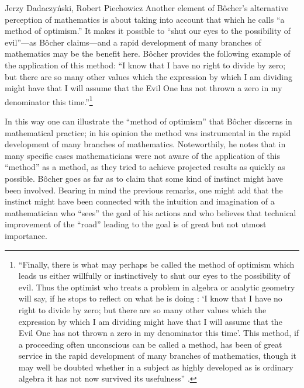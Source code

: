 \begin{artengenv}{Jerzy Dadaczyński, Robert Piechowicz}
Another element of Bôcher's alternative perception of mathematics is about taking into account that which he calls ``a method of optimism.'' It makes it possible to ``shut our eyes to the possibility of evil''---as Bôcher claims---and a rapid development of many branches of mathematics may be the benefit here. Bôcher provides the following example of the application of this method: ``I know that I have no right to divide by zero; but there are so many other values which the expression by which I am dividing might have that I will assume that the Evil One has not thrown a zero in my denominator this time.''\footnote{``Finally, there is what may perhaps be called the method of optimism which leads us either willfully or instinctively to shut our eyes to the possibility of evil. Thus the optimist who treats a problem in algebra or analytic geometry will say, if he stops to reflect on what he is doing : ‘I know that I have no right to divide by zero; but there are so many other values which the expression by which I am dividing might have that I will assume that the Evil One has not thrown a zero in my denominator this time'. This method, if a proceeding often unconscious can be called a method, has been of great service in the rapid development of many branches of mathematics, though it may well be doubted whether in a subject as highly developed as is ordinary algebra it has not now survived its usefulness''
\parencite[][pp.134–135]{bocher_fundamental_1904}.%
}

In this way one can illustrate the ``method of optimism'' that Bôcher discerns in mathematical practice; in his opinion the method was instrumental in the rapid development of many branches of mathematics. Noteworthily, he notes that in many specific cases mathematicians were not aware of the application of this ``method'' as a method, as they tried to achieve projected results as quickly as possible. Bôcher goes as far as to claim that some kind of instinct might have been involved. Bearing in mind the previous remarks, one might add that the instinct might have been connected with the intuition and imagination of a mathematician who ``sees'' the goal of his actions and who believes that technical improvement of the ``road'' leading to the goal is of great but not utmost importance.


\end{artengenv}

